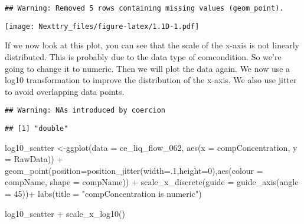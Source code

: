 \documentclass[
]{book}
\newenvironment{Shaded}{\begin{snugshade}}{\end{snugshade}}
\newcommand{\AttributeTok}[1]{\textcolor[rgb]{0.77,0.63,0.00}{#1}}
\newcommand{\DecValTok}[1]{\textcolor[rgb]{0.00,0.00,0.81}{#1}}
\newcommand{\FunctionTok}[1]{\textcolor[rgb]{0.00,0.00,0.00}{#1}}
\newcommand{\NormalTok}[1]{#1}
\newcommand{\OtherTok}[1]{\textcolor[rgb]{0.56,0.35,0.01}{#1}}
\newcommand{\SpecialCharTok}[1]{\textcolor[rgb]{0.00,0.00,0.00}{#1}}
\newcommand{\StringTok}[1]{\textcolor[rgb]{0.31,0.60,0.02}{#1}}
\begin{document}
\begin{verbatim}
## Warning: Removed 5 rows containing missing values (geom_point).
\end{verbatim}

\texttt{[image: Nexttry\_files/figure-latex/1.1D-1.pdf]}

If we now look at this plot, you can see that the scale of the x-axis is not linearly distributed. This is probably due to the data type of comcondition. So we're going to change it to numeric. Then we will plot the data again. We now use a log10 transformation to improve the distribution of the x-axis. We also use jitter to avoid overlapping data points.

\begin{Shaded}
\end{Shaded}

\begin{verbatim}
## Warning: NAs introduced by coercion
\end{verbatim}

\begin{Shaded}
\end{Shaded}

\begin{verbatim}
## [1] "double"
\end{verbatim}

\begin{Shaded}
\begin{Highlighting}[]
\NormalTok{log10\_scatter }\OtherTok{\textless{}{-}}\FunctionTok{ggplot}\NormalTok{(}\AttributeTok{data =}\NormalTok{ ce\_liq\_flow\_062, }\FunctionTok{aes}\NormalTok{(}\AttributeTok{x =}\NormalTok{ compConcentration, }\AttributeTok{y =}\NormalTok{ RawData)) }\SpecialCharTok{+}
  \FunctionTok{geom\_point}\NormalTok{(}\AttributeTok{position=}\FunctionTok{position\_jitter}\NormalTok{(}\AttributeTok{width=}\NormalTok{.}\DecValTok{1}\NormalTok{,}\AttributeTok{height=}\DecValTok{0}\NormalTok{),}\FunctionTok{aes}\NormalTok{(}\AttributeTok{colour =}\NormalTok{ compName, }\AttributeTok{shape =}\NormalTok{ compName)) }\SpecialCharTok{+}
   \FunctionTok{scale\_x\_discrete}\NormalTok{(}\AttributeTok{guide =} \FunctionTok{guide\_axis}\NormalTok{(}\AttributeTok{angle =} \DecValTok{45}\NormalTok{))}\SpecialCharTok{+}
   \FunctionTok{labs}\NormalTok{(}\AttributeTok{title =} \StringTok{"compConcentration is numeric"}\NormalTok{) }


\NormalTok{log10\_scatter }\SpecialCharTok{+} \FunctionTok{scale\_x\_log10}\NormalTok{()}
\end{Highlighting}
\end{Shaded}
\end{document}
